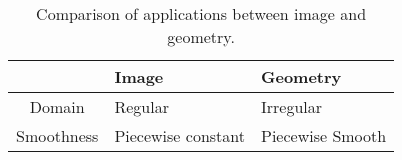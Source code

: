 \label{sec:Survey}

\begin{table}
\begin{center}
\tiny{
\caption{Comparison of applications between image and geometry.}

    \begin{tabular}{| c |  p{1.0in}<{\centering} |  p{1.0in}<{\centering} |}\hline
                            &   Image                 &    Geometry     \\ \hline
        Domain              &   Regular               &    Irregular   \\ \hline
        Smoothness          &   Piecewise constant    &  Piecewise Smooth  \\ \hline
    \end{tabular}
    \label{table:difference}
}
\end{center}
\end{table}







